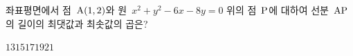 좌표평면에서 점~$\mathrm{A}(1{,}\mkern3mu 2)$와 원~$x^2+y^2-6x-8y=0$ 위의 점~$\mathrm{P}$에 대하여 선분~$\mathrm{AP}$의 길이의 최댓값과 최솟값의 곱은?
\begin{choices32}{$13$}{$15$}{$17$}{$19$}{$21$}\end{choices32}
